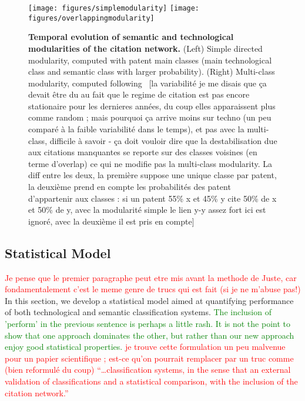 \documentclass[10pt,A4]{article}
\begin{document}
\begin{figure}[!ht]
\centering
\texttt{[image: figures/simplemodularity]}
\texttt{[image: figures/overlappingmodularity]}
\caption{\textbf{Temporal evolution of semantic and technological modularities of the citation network.} (Left) Simple directed modularity, computed with patent main classes (main technological class and semantic class with larger probability). (Right) Multi-class modularity, computed following~\cite{nicosia2009extending} [la variabilité je me disais que ça devait être du au fait que le regime de citation est pas encore stationaire pour les dernieres années, du coup elles apparaissent plus comme random ; mais pourquoi ça arrive moins sur techno (un peu comparé à la faible variabilité dans le temps), et pas avec la multi-class, difficile à savoir - ça doit vouloir dire que la destabilisation due aux citations manquantes se reporte sur des classes voisines (en terme d'overlap) ce qui ne modifie pas la multi-class modularity. La diff entre les deux, la première suppose une unique classe par patent, la deuxième prend en compte les probabilités des patent d'appartenir aux classes : si un patent 55\% x et 45\% y cite 50\% de x et 50\% de y, avec la modularité simple le lien y-y assez fort ici est ignoré, avec la deuxième il est pris en compte]}
\label{fig:modularities}
\end{figure}














\subsection{Statistical Model}
\label{statisticalmodel}
\textcolor{red}{Je pense que le premier paragraphe peut etre mis avant la methode de Juste, car fondamentalement c'est le meme genre de trucs qui est fait (si je ne m'abuse pas!)}  
In this section, we develop a statistical model aimed at quantifying performance of both technological and semantic classification systems.
\textcolor{green}{The inclusion of 'perform' in the previous sentence is perhaps a little rash. It is not the point to show that one approach dominates the other, but rather than our new approach enjoy good statistical properties.} \textcolor{red}{je trouve cette formulation un peu malvenue pour un papier scientifique ; est-ce qu'on pourrait remplacer par un truc comme (bien reformulé du coup) ``\ldots classification systems, in the sense that an external validation of classifications and a statistical comparison, with the inclusion of the citation network.''}
\end{document}
